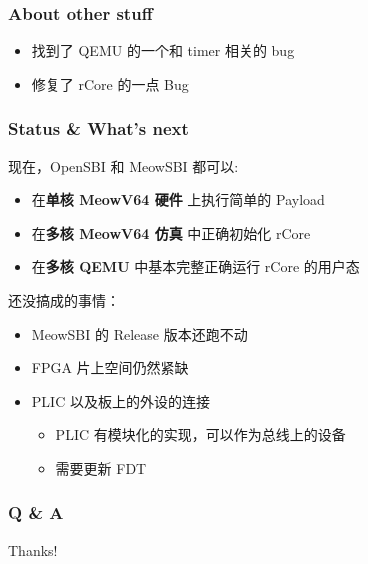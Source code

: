 \documentclass[UTF-8]{ctexbeamer}
\begin{document}
\begin{frame}
  \frametitle{About other stuff}

  \begin{itemize}
    \item 找到了 QEMU 的一个和 timer 相关的 bug
    \item 修复了 rCore 的一点 Bug
  \end{itemize}
\end{frame}

\begin{frame}
  \frametitle{Status \& What's next}

  现在，OpenSBI 和 MeowSBI 都可以:
  \begin{itemize}
    \item 在\textbf{单核 MeowV64 硬件} 上执行简单的 Payload
    \item 在\textbf{多核 MeowV64 仿真} 中正确初始化 rCore
    \item 在\textbf{多核 QEMU} 中基本完整正确运行 rCore 的用户态
  \end{itemize}

  \pause
  \vspace{1em}

  还没搞成的事情：
  \begin{itemize}
    \item MeowSBI 的 Release 版本还跑不动
    \item FPGA 片上空间仍然紧缺
    \item PLIC 以及板上的外设的连接
    \begin{itemize}
      \item PLIC 有模块化的实现，可以作为总线上的设备
      \item 需要更新 FDT
    \end{itemize}
  \end{itemize}
\end{frame}

\begin{frame}
  \frametitle{Q \& A}

  Thanks!
\end{frame}
\end{document}
